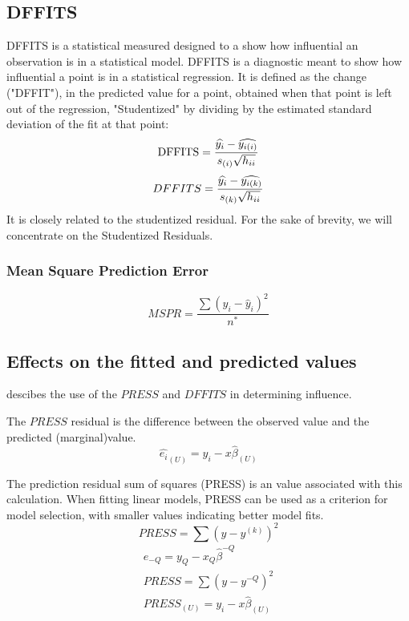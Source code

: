 \documentclass[12pt, a4paper]{report}
\theoremstyle{plain}
\theoremstyle{definition}
\theoremstyle{remark}
\begin{document}
\subsection{DFFITS} %
DFFITS is a statistical measured designed to a show how influential an observation is in a statistical model. DFFITS is a diagnostic meant to show how influential a point is in a statistical regression. It is defined as the change ("DFFIT"), in the predicted value for a point, obtained when that point is left out of the regression, "Studentized" by dividing by the estimated standard deviation of the fit at that point:
\[ \mbox{DFFITS} = {\widehat{y_i} - \widehat{y_{i(i)}} \over s_{(i)} \sqrt{h_{ii}}}\]
\begin{displaymath} DFFITS = {\widehat{y_i} -
	\widehat{y_{i(k)}} \over s_{(k)} \sqrt{h_{ii}}} \end{displaymath}
It is closely related to the studentized residual. For the sake of brevity, we will concentrate on the Studentized Residuals.

\subsubsection{Mean Square Prediction Error}
\begin{equation}
MSPR = \frac{\sum (y_{i}-\hat{y}_{i})^2}{n^*}
\end{equation}

\subsection{Effects on the fitted and predicted values}
\citet{schabenberger} descibes the use of the $PRESS$ and $DFFITS$ in determining influence.

The $PRESS$ residual is the difference between the observed value and the predicted (marginal)value.
\begin{equation}
\hat{e_{i}}_{(U)} = y_{i} - x\hat{\beta}_{(U)}
\end{equation}

The prediction residual sum of squares (PRESS) is an value associated with this calculation. When fitting linear models, PRESS can be used as a criterion for model selection, with smaller values indicating better model fits.
\begin{equation}
	PRESS = \sum(y-y^{(k)})^2
\end{equation}
\begin{eqnarray*}
	e_{-Q} = y_{Q} - x_{Q}\hat{\beta}^{-Q}\\
	PRESS = \sum(y-y^{-Q})^2\\
	PRESS_{(U)} = y_{i} - x\hat{\beta}_{(U)}\\
\end{eqnarray*}
\end{document}

